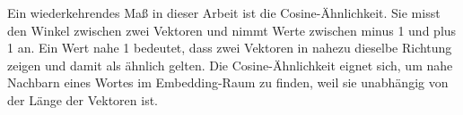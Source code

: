 Ein wiederkehrendes Maß in dieser Arbeit ist die Cosine-Ähnlichkeit. Sie misst den Winkel zwischen zwei Vektoren und nimmt Werte zwischen minus 1 und plus 1 an. Ein Wert nahe 1 bedeutet, dass zwei Vektoren in nahezu dieselbe Richtung zeigen und damit als ähnlich gelten. Die Cosine-Ähnlichkeit eignet sich, um nahe Nachbarn eines Wortes im Embedding-Raum zu finden, weil sie unabhängig von der Länge der Vektoren ist.
